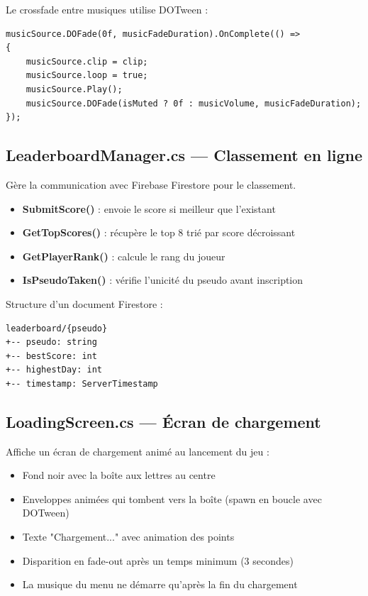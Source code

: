 \documentclass[12pt,a4paper]{article}
\begin{document}
Le crossfade entre musiques utilise DOTween :
\begin{lstlisting}
musicSource.DOFade(0f, musicFadeDuration).OnComplete(() =>
{
    musicSource.clip = clip;
    musicSource.loop = true;
    musicSource.Play();
    musicSource.DOFade(isMuted ? 0f : musicVolume, musicFadeDuration);
});
\end{lstlisting}

\subsection{LeaderboardManager.cs — Classement en ligne}

Gère la communication avec Firebase Firestore pour le classement.

\begin{itemize}
    \item \textbf{SubmitScore()} : envoie le score si meilleur que l'existant
    \item \textbf{GetTopScores()} : récupère le top 8 trié par score décroissant
    \item \textbf{GetPlayerRank()} : calcule le rang du joueur
    \item \textbf{IsPseudoTaken()} : vérifie l'unicité du pseudo avant inscription
\end{itemize}

Structure d'un document Firestore :
\begin{verbatim}
leaderboard/{pseudo}
+-- pseudo: string
+-- bestScore: int
+-- highestDay: int
+-- timestamp: ServerTimestamp
\end{verbatim}

\subsection{LoadingScreen.cs — Écran de chargement}

Affiche un écran de chargement animé au lancement du jeu :
\begin{itemize}
    \item Fond noir avec la boîte aux lettres au centre
    \item Enveloppes animées qui tombent vers la boîte (spawn en boucle avec DOTween)
    \item Texte "Chargement..." avec animation des points
    \item Disparition en fade-out après un temps minimum (3 secondes)
    \item La musique du menu ne démarre qu'après la fin du chargement
\end{itemize}
\end{document}
